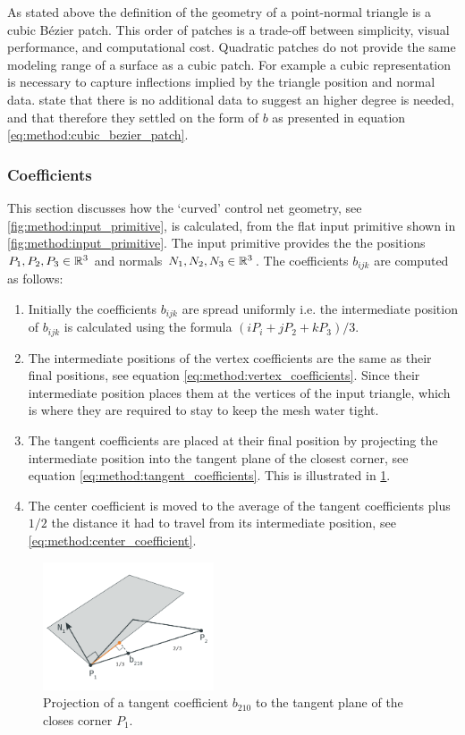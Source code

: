 As stated above the definition of the geometry of a point-normal triangle is a cubic Bézier patch. This order of patches is a trade-off between simplicity, visual performance, and computational cost. Quadratic patches do not provide the same modeling range of a surface as a cubic patch. For example a cubic representation is necessary to capture inflections implied by the triangle position and normal data. \citeauthor{vlachos2001curved} state that there is no additional data to suggest an higher degree is needed, and that therefore they settled on the form of $b$ as presented in equation \ref{eq:method:cubic_bezier_patch}.

\subsubsection{Coefficients} \label{sss:control_point_construction}
This section discusses how the `curved' control net geometry, see \cref{fig:method:input_primitive}, is calculated, from the flat input primitive shown in \cref{fig:method:input_primitive}. The input primitive provides the the positions $P_1, P_2, P_3 \in \mathbb{R}^3$ and normals $N_1, N_2, N_3 \in \mathbb{R}^3$. The coefficients $b_{ijk}$ are computed as follows:
%
\begin{enumerate}[label=(\roman*)]
	\item 
		Initially the coefficients $b_{ijk}$ are spread uniformly i.e. the intermediate position of $b_{ijk}$ is calculated using the formula $(i P_i + j P_2 + kP_3) / 3$. 
	\item 
		The intermediate positions of the vertex coefficients are the same as their final positions, see equation \eqref{eq:method:vertex_coefficients}. Since their intermediate position places them at the vertices of the input triangle, which is where they are required to stay to keep the mesh water tight.
	\item 
		The tangent coefficients are placed at their final position by projecting the intermediate position into the tangent plane of the closest corner, see equation \eqref{eq:method:tangent_coefficients}. This is illustrated in \cref{fig:method:geometry_tangent_projection.png}.
	\item The center coefficient is moved to the average of the tangent coefficients plus $1/2$ the distance it had to travel from its intermediate position, see \cref{eq:method:center_coefficient}.
\end{enumerate}
%
\begin{figure}
	\centering
	\includegraphics[width=0.45\textwidth]{./content/img/method/geometry_tangent_projection.png}
	\caption{Projection of a tangent coefficient $b_{210}$ to the tangent plane of the closes corner $P_1$.}
	\label{fig:method:geometry_tangent_projection.png}
\end{figure}


